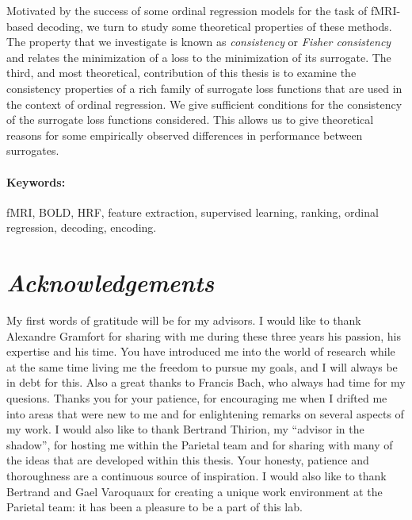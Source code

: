 \documentclass[nobib, a4paper, notoc, twoside, justified]{tufte-book}
\begin{document}
Motivated by the success of some ordinal regression models for the task of fMRI-based decoding, we turn to study some theoretical properties of these methods. The property that we investigate is known as \emph{consistency} or \emph{Fisher consistency} and relates the minimization of a loss to the minimization of its surrogate. The third, and most theoretical, contribution of this thesis is to examine the consistency properties of a rich family of surrogate loss functions that are used in the context of ordinal regression. 
We give sufficient conditions for the consistency of the surrogate loss functions considered. This allows us to give theoretical reasons for some empirically observed differences in performance between surrogates.





\vspace{10pt}
\paragraph{Keywords: } fMRI, BOLD, HRF, feature extraction, supervised learning, ranking, ordinal regression, decoding, encoding.

\vspace*{\fill}
\clearpage



\vspace*{\fill}
{\section*{\Huge \it Acknowledgements}}

My first words of gratitude will be for my advisors. I would like to thank Alexandre Gramfort for sharing with me during these three years his passion, his expertise and his time. You have introduced me into the world of research while at the same time living me the freedom to pursue my goals, and I will always be in debt for this. Also a great thanks to Francis Bach, who always had time for my quesions. Thanks you for your patience, for encouraging me when I drifted me into areas that were new to me and for enlightening remarks on several aspects of my work. I would also like to thank Bertrand Thirion, my ``advisor in the shadow'', for hosting me within the Parietal team and for sharing with many of the ideas that are developed within this thesis. Your honesty, patience and thoroughness are a continuous source of inspiration. I would also like to thank Bertrand and Gael Varoquaux for creating a unique work environment at the Parietal team: it has been a pleasure to be a part of this lab.
\end{document}
